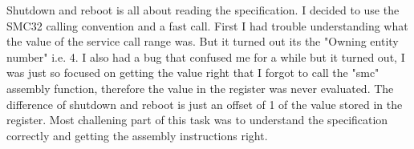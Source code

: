 Shutdown and reboot is all about reading the specification. I decided to use the
SMC32 calling convention and a fast call. First I had trouble understanding what
the value of the service call range was. But it turned out its the "Owning
entity number" i.e. 4. I also had a bug that confused me for a while but it
turned out, I was just so focused on getting the value right that I forgot to
call the "smc" assembly function, therefore the value in the register was never
evaluated. 
The difference of shutdown and reboot is just an offset of 1 of the value stored
in the register.
Most challening part of this task was to understand the specification correctly
and getting the assembly instructions right.
